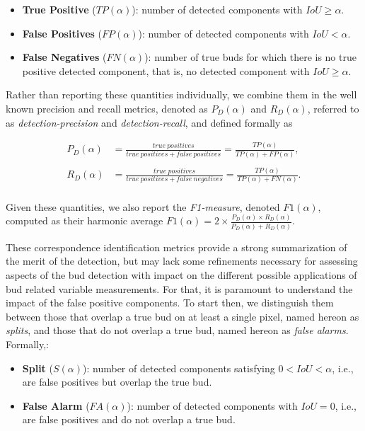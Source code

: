 \documentclass[a4paper,authoryear,review]{elsarticle}
\begin{document}
	\begin{itemize}
		\item \textbf{True Positive} ($TP(\alpha)$): number of detected components with $ IoU \geq \alpha $.
		
		\item \textbf{False Positives} ($FP(\alpha)$): number of detected components with $IoU < \alpha$.
		
		\item \textbf{False Negatives} ($FN(\alpha)$):  number of true buds for which there is no true positive detected component, that is, no detected component with $IoU \geq \alpha$. 
		
	\end{itemize}
	
	Rather than reporting these quantities individually, we combine them in the well known precision and recall metrics, denoted as $P_D(\alpha)$ and $R_D(\alpha)$, referred to as \emph{detection-precision} and \emph{detection-recall}, and defined formally as
	
	\begin{align*}
	P_D(\alpha) &= \frac{true\ positives}{true\ positives+false\ positives}
	= \frac{TP(\alpha)}{TP(\alpha)+FP(\alpha)} ,\\
	\\
	R_D(\alpha) &= \frac{true\ positives}{true\ positives+false\ negatives}
	= \frac{TP(\alpha)}{TP(\alpha)+FN(\alpha)} .\\
	\end{align*}
	
	Given these quantities, we also report the \emph{F1-measure}, denoted $F1(\alpha)$, computed as their harmonic average $F1(\alpha) = 2 \times \frac{P_D(\alpha) \times R_D(\alpha)}{P_D(\alpha) + R_D(\alpha)}$.
	
	These correspondence identification metrics provide a strong summarization of the merit of the detection, but may lack some refinements necessary for assessing aspects of the bud detection with impact on the different possible applications of bud related variable measurements. For that, it is paramount to understand the impact of the false positive components. To start then, we distinguish them  between those that overlap a true bud on at least a single pixel, named hereon as \emph{splits}, and those that do not overlap a true bud, named hereon as \emph{false alarms}. Formally,:
	
	\begin{itemize}
		\item \textbf{Split} ($S(\alpha)$): number of detected components satisfying $0 < IoU < \alpha$, i.e., are false positives but overlap the true bud. 
		
		\item \textbf{False Alarm} ($FA(\alpha)$): number of detected components with $IoU = 0$, i.e., are false positives and do not overlap a true bud.
	\end{itemize}
	
\end{document}
